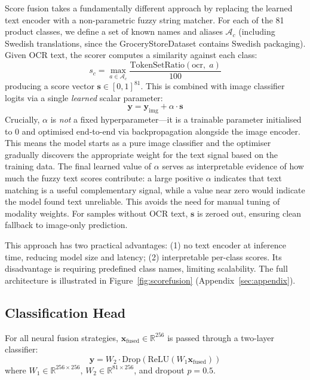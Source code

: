 \documentclass[10pt,twocolumn]{article}
\begin{document}
Score fusion takes a fundamentally different approach by replacing the learned text encoder with a non-parametric fuzzy string matcher. For each of the 81 product classes, we define a set of known names and aliases $\mathcal{A}_c$ (including Swedish translations, since the GroceryStoreDataset contains Swedish packaging). Given OCR text, the scorer computes a similarity against each class:
\begin{equation}
    s_c = \max_{a \in \mathcal{A}_c} \frac{\text{TokenSetRatio}(\text{ocr},\; a)}{100}
\end{equation}
producing a score vector $\mathbf{s} \in [0, 1]^{81}$. This is combined with image classifier logits via a single \emph{learned} scalar parameter:
\begin{equation}
    \mathbf{y} = \mathbf{y}_{\text{img}} + \alpha \cdot \mathbf{s}
\end{equation}
Crucially, $\alpha$ is \emph{not} a fixed hyperparameter---it is a trainable parameter initialised to 0 and optimised end-to-end via backpropagation alongside the image encoder. This means the model starts as a pure image classifier and the optimiser gradually discovers the appropriate weight for the text signal based on the training data. The final learned value of $\alpha$ serves as interpretable evidence of how much the fuzzy text scores contribute: a large positive $\alpha$ indicates that text matching is a useful complementary signal, while a value near zero would indicate the model found text unreliable. This avoids the need for manual tuning of modality weights. For samples without OCR text, $\mathbf{s}$ is zeroed out, ensuring clean fallback to image-only prediction.

This approach has two practical advantages: (1) no text encoder at inference time, reducing model size and latency; (2) interpretable per-class scores. Its disadvantage is requiring predefined class names, limiting scalability. The full architecture is illustrated in Figure~\ref{fig:scorefusion} (Appendix~\ref{sec:appendix}).

\subsection{Classification Head}

For all neural fusion strategies, $\mathbf{x}_{\text{fused}} \in \mathbb{R}^{256}$ is passed through a two-layer classifier:
\begin{equation}
    \mathbf{y} = W_2 \cdot \text{Drop}(\text{ReLU}(W_1 \mathbf{x}_{\text{fused}}))
\end{equation}
where $W_1 \in \mathbb{R}^{256 \times 256}$, $W_2 \in \mathbb{R}^{81 \times 256}$, and dropout $p = 0.5$.
\end{document}
